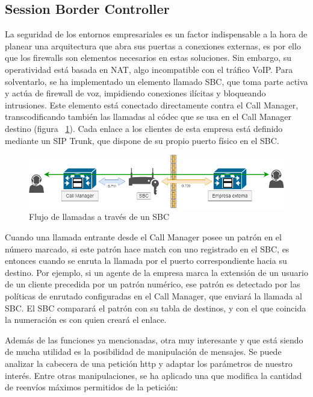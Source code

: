 \documentclass[a4paper, 12pt]{book}
\begin{document}
\subsection{Session Border Controller}
\label{sec:sbc}

La seguridad de los entornos empresariales es un factor indispensable a la hora de planear una arquitectura que abra sus puertas a conexiones externas, es por ello que los firewalls son elementos necesarios en estas soluciones. Sin embargo, su operatividad está basada en NAT, algo incompatible con el tráfico VoIP.
Para solventarlo, se ha implementado un elemento llamado SBC, que toma parte activa y actúa de firewall de voz, impidiendo conexiones ilícitas y bloqueando intrusiones. Este elemento está conectado directamente contra el Call Manager, transcodificando también las llamadas al códec que se usa en el Call Manager destino (figura ~\ref{figura:fig_sbc}). Cada enlace a los clientes de esta empresa está definido mediante un SIP Trunk, que dispone de su propio puerto físico en el SBC.

\begin{figure}[h]
  \centering
  \includegraphics[scale=0.6]{img/fig_sbc}
  \caption{Flujo de llamadas a través de un SBC}
  \label{figura:fig_sbc}
\end{figure}

Cuando una llamada entrante desde el Call Manager posee un patrón en el número marcado, si este patrón hace match con uno registrado en el SBC, es entonces cuando se enruta la llamada por el puerto correspondiente hacia su destino.
Por ejemplo, si un agente de la empresa marca la extensión de un usuario de un cliente precedida por un patrón numérico, ese patrón es detectado por las políticas de enrutado configuradas en el Call Manager, que enviará la llamada al SBC. El SBC comparará el patrón con su tabla de destinos, y con el que coincida la numeración es con quien creará el enlace.

Además de las funciones ya mencionadas, otra muy interesante y que está siendo de mucha utilidad es la posibilidad de manipulación de mensajes. Se puede analizar la cabecera de una petición http y adaptar los parámetros de nuestro interés. Entre otras manipulaciones, se ha aplicado una que modifica la cantidad de reenvíos máximos permitidos de la petición:
\end{document}
